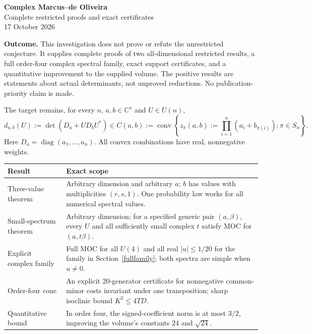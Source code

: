 \documentclass[11pt]{article}
\newcommand{\C}{\mathbb C}\newcommand{\R}{\mathbb R}\newcommand{\conv}{\operatorname{conv}}\newcommand{\diag}{\operatorname{diag}}\newcommand{\tr}{\operatorname{tr}}
\begin{document}
\begin{center}
{\LARGE\bfseries\color{ink} Complex Marcus--de Oliveira}\\[6pt]
{\Large Complete restricted proofs and exact certificates}\\[8pt]
17 October 2026
\end{center}

\textbf{Outcome.} This investigation does not prove or refute the unrestricted conjecture. It supplies complete proofs of two all-dimensional restricted results, a full order-four complex spectral family, exact support certificates, and a quantitative improvement to the supplied volume. The positive results are statements about actual determinants, not unproved reductions. No publication-priority claim is made.

The target remains, for every $n$, $a,b\in\C^n$ and $U\in U(n)$,
\begin{equation}\label{moc}
d_{a,b}(U):=\det(D_a+UD_bU^*)\in
C(a,b):=\conv\left\{z_\pi(a,b):=\prod_{i=1}^n(a_i+b_{\pi(i)}):\pi\in S_n\right\}.
\end{equation}
Here $D_a=\diag(a_1,\ldots,a_n)$. All convex combinations have real, nonnegative weights.

\begin{center}\begin{tabular}{p{}p{}}
\toprule
Result & Exact scope \\\midrule
Three-value theorem & Arbitrary dimension and arbitrary $a$; $b$ has values with multiplicities $(r,s,1)$. One probability law works for all numerical spectral values.\\
Small-spectrum theorem & Arbitrary dimension; for a specified generic pair $(a,\beta)$, every $U$ and all sufficiently small complex $t$ satisfy MOC for $(a,t\beta)$.\\
Explicit complex family & Full MOC for all $U(4)$ and all real $|u|\le1/20$ for the family in Section~\ref{fullfamily}; both spectra are simple when $u\ne0$.\\
Order-four cone & An explicit 20-generator certificate for nonnegative common-minor costs invariant under one transposition; sharp isoclinic bound $K^2\le4TD$.\\
Quantitative bound & In order four, the signed-coefficient norm is at most $3/2$, improving the volume's constants $24$ and $\sqrt{24}$.\\\bottomrule
\end{tabular}\end{center}
\end{document}

